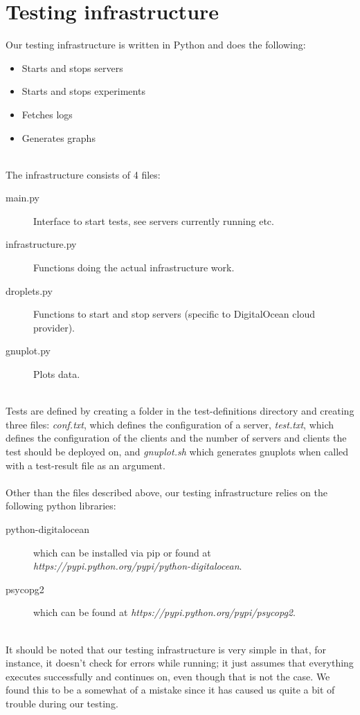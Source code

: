 \documentclass{article}
\begin{document}
    \section{Testing infrastructure}
        Our testing infrastructure is written in Python and does the following:
        \begin{itemize}
            \item Starts and stops servers
            \item Starts and stops experiments
            \item Fetches logs
            \item Generates graphs
        \end{itemize}
        ~\\
        The infrastructure consists of 4 files:
        \begin{description}
            \item[main.py] Interface to start tests, see servers currently running etc.
            \item[infrastructure.py] Functions doing the actual infrastructure work.
            \item[droplets.py] Functions to start and stop servers (specific to DigitalOcean cloud provider).
            \item[gnuplot.py] Plots data.
        \end{description}
        ~\\
        Tests are defined by creating a folder in the test-definitions directory and creating three files: \textit{conf.txt}, which defines the configuration of a server, \textit{test.txt}, which defines the configuration of the clients and the number of servers and clients the test should be deployed on, and \textit{gnuplot.sh} which generates gnuplots when called with a test-result file as an argument.\\
        \\
        Other than the files described above, our testing infrastructure relies on the following python libraries: 
        \begin{description}
            \item[python-digitalocean] which can be installed via pip or found at \textit{https://pypi.python.org/pypi/python-digitalocean}.
            \item[psycopg2] which can be found at \textit{https://pypi.python.org/pypi/psycopg2}.
        \end{description}
        ~\\
        It should be noted that our testing infrastructure is very simple in that, for instance, it doesn't check for errors while running; it just assumes that everything executes successfully and continues on, even though that is not the case. We found this to be a somewhat of a mistake since it has caused us quite a bit of trouble during our testing.
\end{document}
